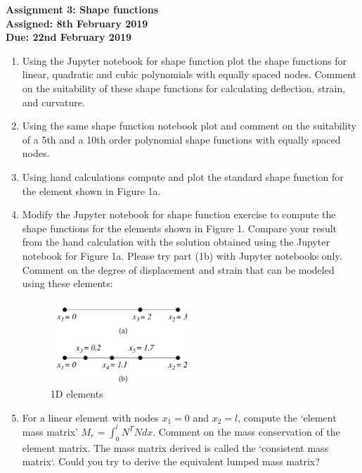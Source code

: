 \documentclass[a4paper,12pt]{article}
\begin{document}
\begin{centering}
	\textbf{
		Assignment 3: Shape functions\\
		Assigned: 8th February 2019\\
		Due: 22nd February 2019\\
	}
\end{centering}

\vspace{1em}
 
\begin{enumerate}

	\item Using the Jupyter notebook for shape function plot the shape functions for linear, quadratic and cubic polynomials with equally spaced nodes. Comment on the suitability of these shape functions for calculating deflection, strain, and curvature.
	
	\item Using the same shape function notebook plot and comment on the suitability of a 5th and a 10th order polynomial shape functions with equally spaced nodes.

	\item Using hand calculations compute and plot the standard shape function for the element shown in Figure 1a.
	
	\item Modify the Jupyter notebook for shape function exercise to compute the shape functions for the elements shown in Figure 1. Compare your result from the  hand calculation with the solution obtained using the Jupyter notebook for Figure 1a. Please try part (1b) with Jupyter notebooks only. Comment on the degree of displacement and strain that can be modeled using these elements:
	\begin{figure}[!h]
		\centering
		\includegraphics[width=0.5\textwidth]{figs/shapefns.png}
		\caption{1D elements}
	\end{figure}

	\item For a linear element with nodes $x_1 = 0$ and $x_2 = l$, compute the `element mass matrix' $M_e = \int_0^l N^T N dx$. Comment on the mass conservation of the element matrix. The mass matrix derived is called the `consistent mass matrix`. Could you try to derive the equivalent lumped mass matrix?
	
\end{enumerate}
\end{document}

